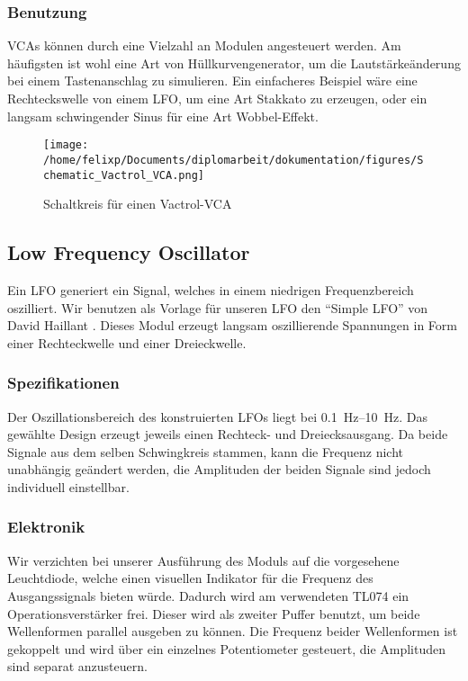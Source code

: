 \subsubsection{Benutzung}
\label{sec:orgb59c812}
\acp{VCA} können durch eine Vielzahl an Modulen angesteuert werden. Am häufigsten ist wohl eine Art von Hüllkurvengenerator, um die Lautstärkeänderung bei einem Tastenanschlag zu simulieren. Ein einfacheres Beispiel wäre eine Rechteckswelle von einem LFO, um eine Art Stakkato zu erzeugen, oder ein langsam schwingender Sinus für eine Art Wobbel-Effekt.

\begin{figure}[hp]
\centering
\texttt{[image: /home/felixp/Documents/diplomarbeit/dokumentation/figures/Schematic\_Vactrol\_VCA.png]}
\caption{\label{fig:orge7ce054}Schaltkreis für einen Vactrol-VCA \cite{miaw:vca}}
\end{figure}
\subsection{Low Frequency Oscillator \label{LFO}}
\label{sec:org27a068e}

Ein \ac{LFO} generiert ein Signal, welches in einem niedrigen Frequenzbereich oszilliert. Wir benutzen als Vorlage für unseren \ac{LFO} den "`Simple LFO"' von David Haillant \cite{haillant:lfo}. Dieses Modul erzeugt langsam oszillierende Spannungen in Form einer Rechteckwelle und einer Dreieckwelle.

\subsubsection{Spezifikationen}
\label{sec:org13f63b1}
Der Oszillationsbereich des konstruierten \ac{LFO}s liegt bei \SIrange{0.1}{10}{\hertz}. Das gewählte Design erzeugt jeweils einen Rechteck- und Dreiecksausgang. Da beide Signale aus dem selben Schwingkreis stammen, kann die Frequenz nicht unabhängig geändert werden, die Amplituden der beiden Signale sind jedoch individuell einstellbar.

\subsubsection{Elektronik}
\label{sec:org9a7b4e0}
Wir verzichten bei unserer Ausführung des Moduls auf die vorgesehene Leuchtdiode, welche einen visuellen Indikator für die Frequenz des Ausgangssignals bieten würde. Dadurch wird am verwendeten TL074 ein Operationsverstärker frei. Dieser wird als zweiter Puffer benutzt, um beide Wellenformen parallel ausgeben zu können. Die Frequenz beider Wellenformen ist gekoppelt und wird über ein einzelnes Potentiometer gesteuert, die Amplituden sind separat anzusteuern.

